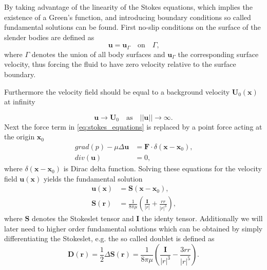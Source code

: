 \documentclass[a4paper,11pt]{kth-mag}
\begin{document}
By taking advantage of the linearity of the Stokes equations, which implies the existence of a Green's function, and introducing boundary conditions so called fundamental solutions can be found. First no-slip conditions on the surface of the slender bodies are defined as
\begin{equation}
  \label{eq:boundary_condition_surface}
  \mathbf{u} = \mathbf{u}_\Gamma  \quad \text{on} \quad  \Gamma \text{,}
\end{equation}
where $\Gamma$ denotes the union of all body surfaces and $\mathbf{u}_\Gamma$ the corresponding surface velocity, thus forcing the fluid to have zero velocity relative to the surface boundary.

Furthermore the velocity field should be equal to a background velocity $\mathbf{U}_0(\mathbf{x})$ at infinity

\begin{equation}
  \label{eq:boundary_condition_background}
  \mathbf{u} \rightarrow \mathbf{U}_0 \quad \text{as} \quad ||\mathbf{u}|| \rightarrow \infty \text{.}
\end{equation}
Next the force term in \eqref{eq:stokes_equations} is replaced by a point force acting at the origin $\mathbf{x}_0$
\begin{equation}
  \label{eq:stokes_equations_point}
  \begin{aligned}
    grad(p) - \mu \Delta \mathbf{u} &= \mathbf{F} \cdot \delta(\mathbf{x} - \mathbf{x}_0) \text{,}\\
    div(\mathbf{u}) &= 0 \text{,}
  \end{aligned}
\end{equation}
where $\delta(\mathbf{x} - \mathbf{x}_0)$ is Dirac delta function. Solving these equations for the velocity field $\mathbf{u}(\mathbf{x})$ yields the fundamental solution
\begin{equation}
  \label{eq:stokeslet}
  \begin{aligned}
    \mathbf{u}(\mathbf{x}) &= \mathbf{S}(\mathbf{x}-\mathbf{x}_0) \text{,}\\
    \mathbf{S}(\mathbf{r}) &= \frac{1}{8\pi\mu} \left(\frac{\mathbf{I}}{|r|} + \frac{rr}{|r|^3}\right) \text{,}
  \end{aligned}
\end{equation}
where $\mathbf{S}$ denotes the Stokeslet tensor and $\mathbf{I}$ the identy tensor. Additionally we will later need to higher order fundamental solutions which can be obtained by simply differentiating the Stokeslet, e.g. the so called doublet is defined as
\begin{equation}
  \label{eq:doublet}
  \mathbf{D}(\mathbf{r}) = \frac{1}{2} \Delta\mathbf{S}(\mathbf{r}) = \frac{1}{8\pi\mu} \left(\frac{\mathbf{I}}{|r|^3} - \frac{3rr}{|r|^5}\right) \text{.}
\end{equation}
\end{document}

